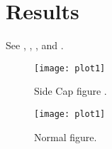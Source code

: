 \section{Results} \label{sec:Results}

\lipsum[17]

See , , ,  and .

\begin{SCfigure}[0.75][h!tbc]
        \centering
                \texttt{[image: plot1]}
				\caption{Side Cap figure \capunit{\celsius}.
				\label{fig:plot1SC}}
\end{SCfigure}

\lipsum[18]






\lipsum[18]



\begin{figure}[h!tbc]
        \centering
        \texttt{[image: plot1]}   
	\caption{Normal figure. \label{fig:plot1N}}
\end{figure}


\lipsum[19]

